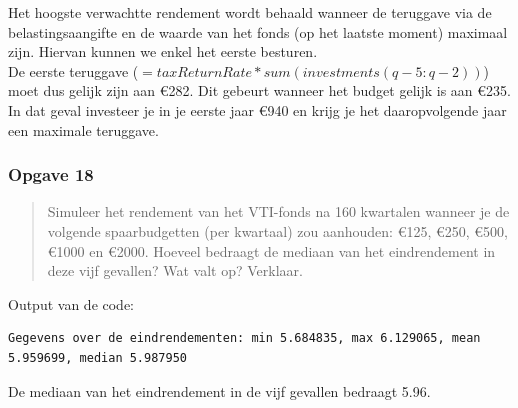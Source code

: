 \documentclass[11pt, a4paper, titlepage, openright]{article}
\begin{document}
		\noindent Het hoogste verwachtte rendement wordt behaald wanneer de teruggave via de belastingsaangifte en 
		de waarde van het fonds (op het laatste moment) maximaal zijn. Hiervan kunnen we enkel het eerste besturen. \\
		De eerste teruggave (\( = taxReturnRate * sum(investments(q-5:q-2)) \)) moet dus gelijk zijn aan \euro282. 
		Dit gebeurt wanneer het budget gelijk is aan \euro 235. In dat geval investeer je in je eerste jaar \euro 940 en 
		krijg je het daaropvolgende jaar een maximale teruggave. 
		
	\newpage
	\subsubsection{Opgave 18}
		\begin{quote}
			Simuleer het rendement van het VTI-fonds na 160 kwartalen wanneer je de volgende spaarbudgetten
			(per kwartaal) zou aanhouden: \euro125, \euro250, \euro500, \euro1000 en \euro2000. Hoeveel bedraagt de
			mediaan van het eindrendement in deze vijf gevallen? Wat valt op? Verklaar.
		\end{quote}
		
		
		\noindent Output van de code:
\begin{lstlisting}
Gegevens over de eindrendementen: min 5.684835, max 6.129065, mean 5.959699, median 5.987950\end{lstlisting}
		De mediaan van het eindrendement in de vijf gevallen bedraagt 5.96.
		
\end{document}
